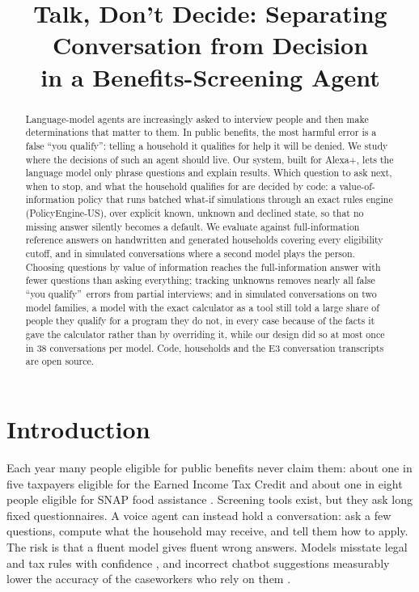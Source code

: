 \documentclass[11pt]{article}
\title{Talk, Don't Decide: Separating Conversation from Decision\\in a Benefits-Screening Agent}
\author{\todo{Author name and affiliation}}
\date{}
\newcommand{\fq}{false ``you qualify''}
\begin{document}
\maketitle

\begin{abstract}
Language-model agents are increasingly asked to interview people and then make determinations that matter to them. In public benefits, the most harmful error is a \fq: telling a household it qualifies for help it will be denied. We study where the decisions of such an agent should live. Our system, built for Alexa+, lets the language model only phrase questions and explain results. Which question to ask next, when to stop, and what the household qualifies for are decided by code: a value-of-information policy that runs batched what-if simulations through an exact rules engine (PolicyEngine-US), over explicit known, unknown and declined state, so that no missing answer silently becomes a default. We evaluate against full-information reference answers on handwritten and generated households covering every eligibility cutoff, and in simulated conversations where a second model plays the person. Choosing questions by value of information reaches the full-information answer with fewer questions than asking everything; tracking unknowns removes nearly all \fq\ errors from partial interviews; and in simulated conversations on two model families, a model with the exact calculator as a tool still told a large share of people they qualify for a program they do not, in every case because of the facts it gave the calculator rather than by overriding it, while our design did so at most once in 38 conversations per model. Code, households and the E3 conversation transcripts are open source.
\end{abstract}

\section{Introduction}
Each year many people eligible for public benefits never claim them: about one in five taxpayers eligible for the Earned Income Tax Credit \citep{irs2026eitcparticipation} and about one in eight people eligible for SNAP food assistance \citep{usda2025snapparticipation}. Screening tools exist, but they ask long fixed questionnaires. A voice agent can instead hold a conversation: ask a few questions, compute what the household may receive, and tell them how to apply. The risk is that a fluent model gives fluent wrong answers. Models misstate legal and tax rules with confidence \citep{dahl2024legalfictions,blairstanek2023statutory,bock2025taxcalcbench}, and incorrect chatbot suggestions measurably lower the accuracy of the caseworkers who rely on them \citep{gosciak2026socialservices}.
\end{document}
